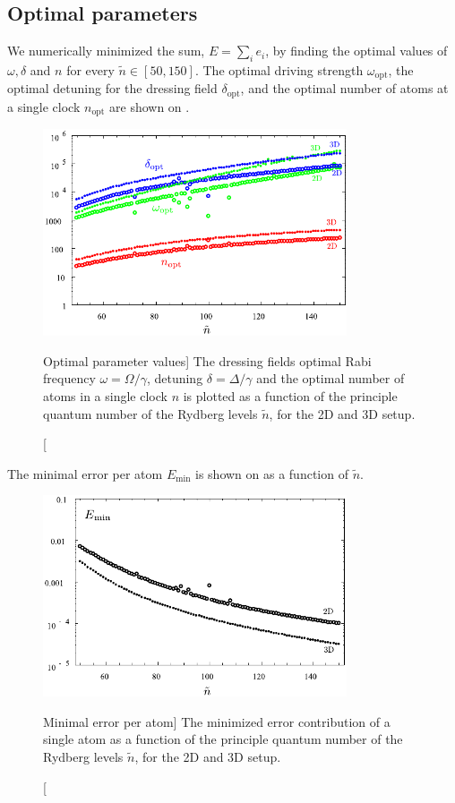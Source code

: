 \subsection{Optimal parameters}
We numerically minimized the sum, $E = \sum_i e_i$, by finding the optimal
values of $\omega, \delta$ and $n$ for every $\tilde n \in [50,150]$. The optimal driving
strength $\omega_\mathrm{opt}$, the optimal
detuning for the dressing field $\delta_\mathrm{opt}$, and  the optimal
number of atoms at a single clock $n_\mathrm{opt}$ are shown on . 
\begin{figure}[h] \centering
\includegraphics[width=0.8\textwidth]{./figs_Komar2015/n_omega_delta_2d3d.pdf} 
\caption
[Optimal parameter values]
{
\label{fig:opts}
The dressing fields optimal Rabi frequency $\omega = \Omega/\gamma$, detuning
$\delta = \Delta/\gamma$ and the optimal number of atoms in a single clock $n$
is plotted as a function of the principle quantum number of the Rydberg levels
$\tilde n$, for the 2D and 3D setup.}  
\end{figure}

The
minimal error per atom $E_\mathrm{min}$ is shown on
  as a function of $\tilde n$.
\begin{figure}[h]
\centering
\includegraphics[width=0.8\textwidth]{./figs_Komar2015/Eone_2d3d.pdf}
\caption
[Minimal error per atom]
{
\label{fig:E_min}
The minimized error contribution of a single atom as a function of the principle
quantum number of the Rydberg levels $\tilde n$, for the 2D and 3D setup.}
\end{figure}



